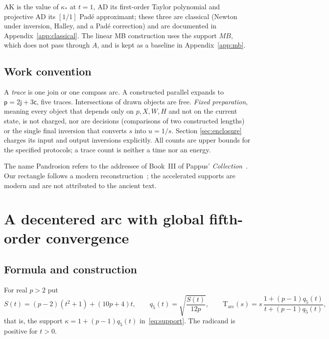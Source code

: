 \documentclass[10pt,a4paper]{article}
\theoremstyle{plain}
\theoremstyle{remark}
\numberwithin{equation}{section}
\newcommand{\jn}{\mathsf{j}}          %
\newcommand{\pl}{\mathsf{p}}          %
\newcommand{\ar}{\mathsf{c}}          %
\newcommand{\Tm}{\mathrm{T}}
\begin{document}
AK is the value of $\kappa_*$ at $t=1$, AD its first-order Taylor polynomial and projective AD its
$[1/1]$ Pad\'e approximant; these three are classical (Newton under inversion, Halley, and a Pad\'e
correction) and are documented in Appendix~\ref{app:classical}. The linear MB construction uses the
support $MB$, which does not pass through $A$, and is kept as a baseline in Appendix~\ref{app:mb}.

\subsection{Work convention}\label{sec:convention}

A \emph{trace} is one join or one compass arc. A constructed parallel expands to $\pl=2\jn+3\ar$, five
traces. Intersections of drawn objects are free. \emph{Fixed preparation}, meaning every object that
depends only on $p,X,W,H$ and not on the current state, is not charged, nor are decisions (comparisons
of two constructed lengths) or the single final inversion that converts $s$ into $u=1/s$. Section
\ref{sec:enclosure} charges its input and output inversions explicitly. All counts are upper bounds for
the specified protocols; a trace count is neither a time nor an energy.

The name Pandrosion refers to the addressee of Book~III of Pappus' \emph{Collection}~\cite{pappus}. Our
rectangle follows a modern reconstruction~\cite{launay}; the accelerated supports are modern and are not
attributed to the ancient text.

\section{A decentered arc with global fifth-order convergence}\label{sec:arc}

\subsection{Formula and construction}

For real $p>2$ put
\begin{equation}\label{eq:arc}
S(t)=(p-2)(t^{2}+1)+(10p+4)t,\qquad q_5(t)=\sqrt{\frac{S(t)}{12p}},\qquad
\Tm_{\mathrm{arc}}(s)=s\,\frac{1+(p-1)q_5(t)}{t+(p-1)q_5(t)},
\end{equation}
that is, the support $\kappa=1+(p-1)q_5(t)$ in~\eqref{eq:support}. The radicand is positive for $t>0$.
\end{document}
